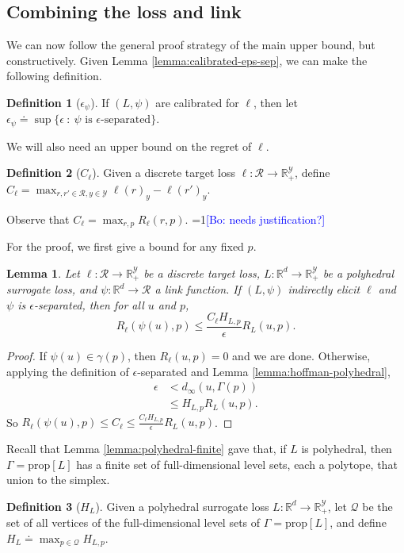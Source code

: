 \documentclass{article}
\newtheorem{lemma}{Lemma}
\theoremstyle{definition}\newtheorem{definition}{Definition}
\theoremstyle{definition}\newtheorem{assumption}{Assumption}
\newcommand{\Comments}{1}
\newcommand{\mynote}[2]{\ifnum\Comments=1\textcolor{#1}{#2}\fi}
\newcommand{\bo}[1]{\mynote{blue}{[Bo: #1]}}
\newcommand{\reals}{\mathbb{R}}
\newcommand{\defeq}{\doteq}%
\newcommand{\prop}[1]{\mathrm{prop}[#1]}
\newcommand{\R}{\mathcal{R}}
\newcommand{\Y}{\mathcal{Y}}
\begin{document}
\subsection{Combining the loss and link}
We can now follow the general proof strategy of the main upper bound, but constructively.
Given Lemma \ref{lemma:calibrated-eps-sep}, we can make the following definition.
\begin{definition}[$\epsilon_{\psi}$]
  If $(L,\psi)$ are calibrated for $\ell$, then let $\epsilon_{\psi} \defeq \sup \{ \epsilon ~:~ \text{$\psi$ is $\epsilon$-separated}\}$.
\end{definition}
We will also need an upper bound on the regret of $\ell$.
\begin{definition}[$C_{\ell}$]
  Given a discrete target loss $\ell: \R \to \reals_+^{\Y}$, define $C_{\ell} = \max_{r,r' \in \R, y \in \Y} \ell(r)_y - \ell(r')_y$.
\end{definition}
Observe that $C_{\ell} = \max_{r,p} R_{\ell}(r,p)$.
\bo{needs justification?}

For the proof, we first give a bound for any fixed $p$.
\begin{lemma} \label{lemma:separated-constant-p}
  Let $\ell: \R \to \reals_+^{\Y}$ be a discrete target loss, $L: \reals^d \to \reals_+^{\Y}$ be a polyhedral surrogate loss, and $\psi: \reals^d \to \R$ a link function.
  If $(L,\psi)$ indirectly elicit $\ell$ and $\psi$ is $\epsilon$-separated, then for all $u$ and $p$,
    \[ R_{\ell}(\psi(u),p) \leq \frac{C_{\ell} H_{L,p}}{\epsilon} R_L(u,p) . \]
\end{lemma}
\begin{proof}
  If $\psi(u) \in \gamma(p)$, then $R_{\ell}(u,p) = 0$ and we are done.
  Otherwise, applying the definition of $\epsilon$-separated and Lemma \ref{lemma:hoffman-polyhedral},
  \begin{align*}
    \epsilon &<    d_{\infty}(u,\Gamma(p))  \\
             &\leq H_{L,p} R_L(u,p) .
  \end{align*}
  So $R_{\ell}(\psi(u),p) \leq C_{\ell} \leq \frac{C_{\ell} H_{L,p}}{\epsilon} R_L(u,p)$.
\end{proof}

Recall that Lemma \ref{lemma:polyhedral-finite} gave that, if $L$ is polyhedral, then $\Gamma = \prop{L}$ has a finite set of full-dimensional level sets, each a polytope, that union to the simplex.
\begin{definition}[$H_L$]
  Given a polyhedral surrogate loss $L: \reals^d \to \reals_+^{\Y}$, let $\mathcal{Q}$ be the set of all vertices of the full-dimensional level sets of $\Gamma = \prop{L}$, and define $H_L \defeq \max_{p \in \mathcal{Q}} H_{L,p}$.
\end{definition}
\end{document}
